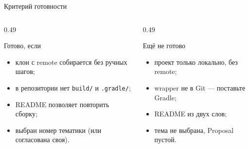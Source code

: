 \begin{frame}{Критерий готовности}
  \vspace{0.3em}
  \begin{columns}[T]
    \begin{column}{0.49\textwidth}
      \begin{block}{Готово, если}
        \begin{itemize}
          \item клон с remote собирается без ручных шагов;
          \item в репозитории нет \texttt{build/} и \texttt{.gradle/};
          \item README позволяет повторить сборку;
          \item выбран номер тематики (или согласована своя).
        \end{itemize}
      \end{block}
    \end{column}
    \begin{column}{0.49\textwidth}
      \begin{block}{Ещё не готово}
        \begin{itemize}
          \item проект только локально, без remote;
          \item wrapper не в Git --- \flqq поставьте Gradle\frqq;
          \item README из двух слов;
          \item тема не выбрана, Proposal пустой.
        \end{itemize}
      \end{block}
    \end{column}
  \end{columns}
\end{frame}
